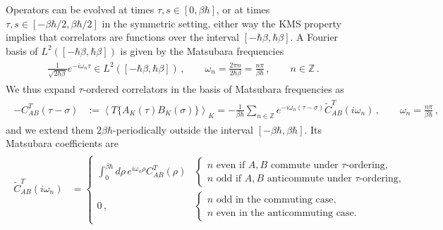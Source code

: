 \documentclass[../QFT_main.tex]{subfiles}
\begin{document}
\begin{mytheorem}
%
Operators can be evolved at times $\tau,s\in[0,\beta\hbar]$, or at times $\tau,s\in[-\beta\hbar/2,\beta\hbar/2]$ in the symmetric setting, either way the KMS property implies that correlators are functions over the interval $[-\hbar\beta,\hbar\beta]$.
A Fourier basis of $L^2([-\hbar\beta,\hbar\beta])$ is given by the Matsubara frequencies
{\small\begin{align}\begin{aligned}
    \tfrac{1}{\sqrt{2\hbar\beta}}e^{-i\omega_n \tau}\in L^2([-\hbar\beta,\hbar\beta])\,,\qquad
    \omega_n=\tfrac{2\pi n}{2\hbar\beta}=\tfrac{n\pi}{\beta\hbar}\,,\qquad n\in\mathbb Z\,. 
\end{aligned}\end{align}}
We thus expand $\tau$-ordered correlators in the basis of Matsubara frequencies as
{\small\begin{align}\begin{aligned}
    -C_{AB}^{T}(\tau-\sigma)
    &:=
    \left\langle
        T\{A_K(\tau)B_K(\sigma)\}
    \right\rangle_K
    =
    - \tfrac{1}{\beta\hbar}\sum_{n\in\mathbb Z}
    e^{-i\omega_n(\tau-\sigma)}
    \widetilde C_{AB}^{T}(i\omega_n)\,,
    \qquad
    \omega_n=\tfrac{n\pi}{\beta\hbar}\,,
\end{aligned}\end{align}}
and we extend them $2\beta\hbar$-periodically outside the interval $[-\beta\hbar,\beta\hbar]$.
Its Matsubara coefficients are 
{\small\begin{align}\begin{aligned}
    \widetilde C_{AB}^{T}(i\omega_n)
    &=
    \begin{cases}
        \displaystyle
        \int_0^{\beta\hbar}\!\!\!d\rho\,
        e^{i\omega_n\rho}C_{AB}^{T}(\rho)
        &
        \begin{cases}
            n\text{ even if }A,B\text{ commute under }\tau\text{-ordering},\\
            n\text{ odd if }A,B\text{ anticommute under }\tau\text{-ordering},
        \end{cases}
        \\[1.1em]
        0\,,
        &
        \begin{cases}
            n\text{ odd in the commuting case},\\
            n\text{ even in the anticommuting case}.
        \end{cases}
    \end{cases}

\end{aligned}
\end{align}}
\end{mytheorem}
\end{document}
